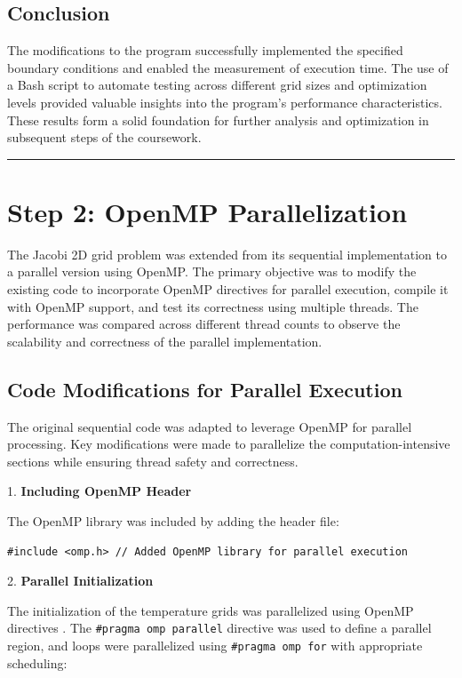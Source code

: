 \documentclass{article}
\begin{document}
\subsection{Conclusion}

The modifications to the program successfully implemented the specified boundary conditions and enabled the measurement of execution time. The use of a Bash script to automate testing across different grid sizes and optimization levels provided valuable insights into the program's performance characteristics. These results form a solid foundation for further analysis and optimization in subsequent steps of the coursework.

\rule{\linewidth}{0.5pt}
\newpage
\section{Step 2: OpenMP Parallelization}

The Jacobi 2D grid problem was extended from its sequential implementation to a parallel version using OpenMP. The primary objective was to modify the existing code to incorporate OpenMP directives for parallel execution, compile it with OpenMP support, and test its correctness using multiple threads. The performance was compared across different thread counts to observe the scalability and correctness of the parallel implementation.

\subsection{Code Modifications for Parallel Execution}

The original sequential code was adapted to leverage OpenMP for parallel processing. Key modifications were made to parallelize the computation-intensive sections while ensuring thread safety and correctness.

1. \textbf{Including OpenMP Header}

   The OpenMP library was included by adding the header file:

\begin{lstlisting}[style=CStyle, caption={OpenMP Header Inclusion}]
#include <omp.h> // Added OpenMP library for parallel execution
\end{lstlisting}

2. \textbf{Parallel Initialization}

    The initialization of the temperature grids was parallelized using OpenMP directives \parencite{chapman2007openmp}. The \texttt{\#pragma omp parallel} directive was used to define a parallel region, and loops were parallelized using \texttt{\#pragma omp for} with appropriate scheduling:
\end{document}
